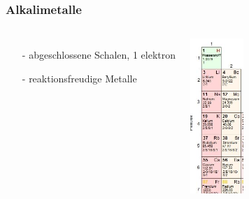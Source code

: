 \begin{frame}
	\frametitle{Alkalimetalle}
	\begin{columns}
		\begin{itemize}
			\item [-] abgeschlossene Schalen, 1 elektron
			\item [-] reaktionsfreudige Metalle
		\end{itemize}
		\includegraphics[width = 2cm]{./pictures/alkalimetalle}
	\end{columns}
\end{frame}


